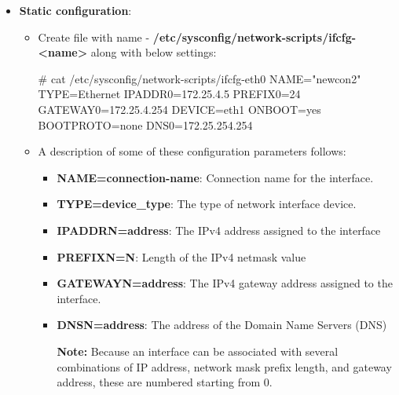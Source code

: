 \begin{flushleft}
\begin{itemize}
	
	
	\newpage
	
	\item \textbf{Static configuration}:
	\begin{itemize}
		\item Create file with name -  \textbf{/etc/sysconfig/network-scripts/ifcfg-<name>} along with below settings:
		\begin{tcolorbox}[breakable,notitle,boxrule=-0pt,colback=black,colframe=black]
			\color{green}
			\font=9pt
			\# cat /etc/sysconfig/network-scripts/ifcfg-eth0
			\color{white}
			\newline
			NAME="newcon2"
			\newline
			TYPE=Ethernet
			\newline
			IPADDR0=172.25.4.5
			\newline
			PREFIX0=24
			\newline
			GATEWAY0=172.25.4.254
			\newline
			DEVICE=eth1
			\newline
			ONBOOT=yes
			\newline
			BOOTPROTO=none
			\newline
			DNS0=172.25.254.254
			\font=4pt
		\end{tcolorbox}
		\bigskip
		\bigskip
		\item A description of some of these configuration parameters follows:
		\begin{itemize}
			\item \textbf{NAME=connection-name}: Connection name for the interface.
			\item \textbf{TYPE=device\_type}: The type of network interface device.
			\item \textbf{IPADDRN=address}: The IPv4 address assigned to the interface
			\item \textbf{PREFIXN=N}: Length of the IPv4 netmask value
			\item \textbf{GATEWAYN=address}: The IPv4 gateway address assigned to the interface. 
			\item \textbf{DNSN=address}: The address of the Domain Name Servers (DNS)

		
			\begin{tcolorbox}[breakable,notitle,boxrule=-0pt,colback=yellow,colframe=yellow]
				\color{black}
				\textbf{Note:} Because an interface can be associated with several combinations of IP address, network mask prefix length, and gateway address, these are numbered starting from 0.
			\end{tcolorbox}


\end{itemize}
\end{itemize}
\end{itemize}
\end{flushleft}
